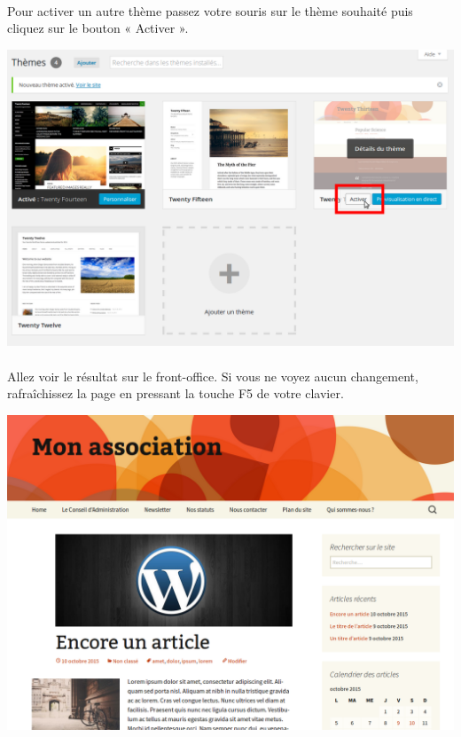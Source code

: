 \documentclass[10pt,a4paper]{article}
\begin{document}
\paragraph{}Pour activer un autre thème passez votre souris sur le thème souhaité puis cliquez sur le bouton « Activer ».
\begin{center}
\includegraphics[scale=0.3]{img/0237.png}
\end{center}
\newpage
\paragraph{}Allez voir le résultat sur le front-office. Si vous ne voyez aucun changement, rafraîchissez la page en pressant la touche F5 de votre clavier.
\begin{center}
\includegraphics[scale=0.3]{img/0238.png}
\end{center}
\end{document}
